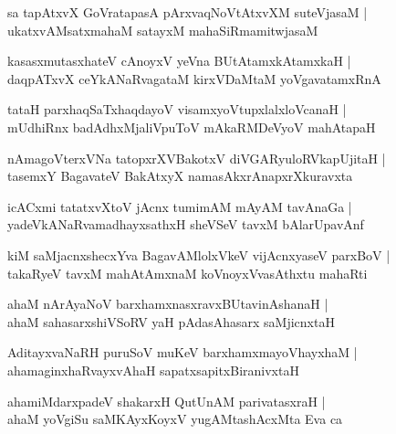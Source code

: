 \begin{shloka}
sa tapAtxvX GoVratapasA pArxvaqNoVtAtxvXM suteVjasaM |\\
ukatxvAMsatxmahaM satayxM mahaSiRmamitwjasaM 
\end{shloka}

\begin{shloka}
kasasxmutasxhateV cAnoyxV yeVna BUtAtamxkAtamxkaH |\\
daqpATxvX ceYkANaRvagataM kirxVDaMtaM yoVgavatamxRnA 
\end{shloka}

\begin{shloka}
tataH parxhaqSaTxhaqdayoV visamxyoVtupxlalxloVcanaH |\\
mUdhiRnx badAdhxMjaliVpuToV mAkaRMDeVyoV mahAtapaH 
\end{shloka}

\begin{shloka}
nAmagoVterxVNa tatopxrXVBakotxV diVGARyuloRVkapUjitaH |\\
tasemxY BagavateV BakAtxyX namasAkxrAnapxrXkuravxta
\end{shloka}

\begin{shloka}
icACxmi tatatxvXtoV jAcnx tumimAM mAyAM tavAnaGa |\\
yadeVkANaRvamadhayxsathxH sheVSeV tavxM bAlarUpavAnf 
\end{shloka}

\begin{shloka}
kiM saMjacnxshecxYva BagavAMlolxVkeV vijAcnxyaseV parxBoV |\\
takaRyeV tavxM mahAtAmxnaM koVnoyxVvasAthxtu mahaRti
\end{shloka}

\begin{shloka}
ahaM nArAyaNoV barxhamxnasxravxBUtavinAshanaH |\\
ahaM sahasarxshiVSoRV yaH pAdasAhasarx saMjicnxtaH 
\end{shloka}

\begin{shloka}
AditayxvaNaRH puruSoV muKeV barxhamxmayoVhayxhaM |\\
ahamaginxhaRvayxvAhaH sapatxsapitxBiranivxtaH 
\end{shloka}

\begin{shloka}
ahamiMdarxpadeV shakarxH QutUnAM parivatasxraH |\\
ahaM yoVgiSu saMKAyxKoyxV yugAMtashAcxMta Eva ca 
\end{shloka}


